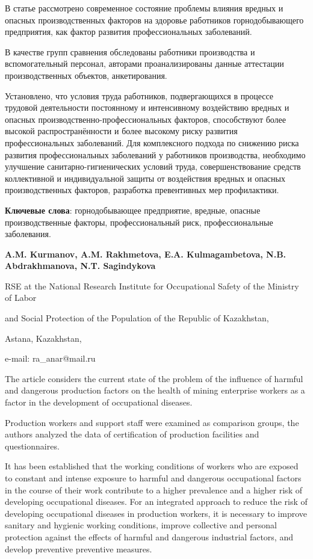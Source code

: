 В статье рассмотрено современное состояние проблемы влияния вредных и
опасных производственных факторов на здоровье работников
горнодобывающего предприятия, как фактор развития профессиональных
заболеваний.

В качестве групп сравнения обследованы работники производства и
вспомогательный персонал, авторами проанализированы данные аттестации
производственных объектов, анкетирования.

Установлено, что условия труда работников, подвергающихся в процессе
трудовой деятельности постоянному и интенсивному воздействию вредных и
опасных производственно-профессиональных факторов, способствуют более
высокой распространённости и более высокому риску развития
профессиональных заболеваний. Для комплексного подхода по снижению риска
развития профессиональных заболеваний у работников производства,
необходимо улучшение санитарно-гигиенических условий труда,
совершенствование средств коллективной и индивидуальной защиты от
воздействия вредных и опасных производственных факторов, разработка
превентивных мер профилактики.

{\bfseries Ключевые слова}: горнодобывающее предприятие, вредные, опасные
производственные факторы, профессиональный риск, профессиональные
заболевания.


\begin{center}
{\bfseries A.M. Kurmanov, A.M. Rakhmetova\envelope, E.A. Kulmagambetova, N.B. Abdrakhmanova, N.T. Sagindykova}

RSE at the National Research Institute for Occupational Safety of the
Ministry of Labor

and Social Protection of the Population of the Republic of Kazakhstan,

Astana, Kazakhstan,

e-mail: ra\_anar@mail.ru
\end{center}

The article considers the current state of the problem of the influence
of harmful and dangerous production factors on the health of mining
enterprise workers as a factor in the development of occupational
diseases.

Production workers and support staff were examined as comparison groups,
the authors analyzed the data of certification of production facilities
and questionnaires.

It has been established that the working conditions of workers who are
exposed to constant and intense exposure to harmful and dangerous
occupational factors in the course of their work contribute to a higher
prevalence and a higher risk of developing occupational diseases. For an
integrated approach to reduce the risk of developing occupational
diseases in production workers, it is necessary to improve sanitary and
hygienic working conditions, improve collective and personal protection
against the effects of harmful and dangerous industrial factors, and
develop preventive preventive measures.

